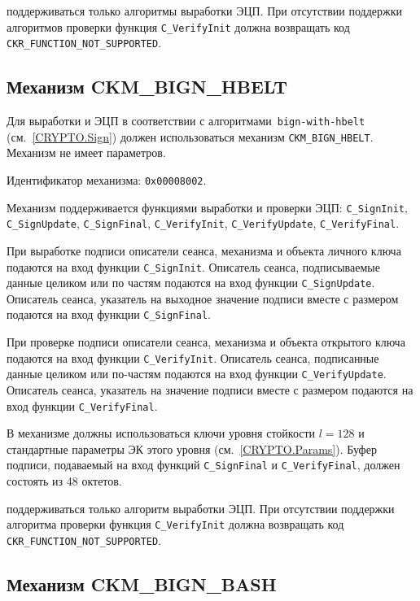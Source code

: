  поддерживаться только алгоритмы выработки ЭЦП.
При отсутствии поддержки алгоритмов проверки 
функция \verb|C_VerifyInit| должна возвращать код 
\verb|CKR_FUNCTION_NOT_SUPPORTED|.
%

\subsection{Механизм CKM\_BIGN\_HBELT}\label{CRYPTOKI.SignHBelt}

Для выработки и  ЭЦП в соответствии с 
алгоритмами~\texttt{bign-with-hbelt} (см.~\ref{CRYPTO.Sign}) должен 
использоваться механизм \verb|CKM_BIGN_HBELT|.
%
Механизм не имеет параметров.

Идентификатор механизма: \texttt{0x00008002}.

Механизм поддерживается функциями выработки и проверки ЭЦП: 
\verb|C_SignInit|, \verb|C_SignUpdate|, \verb|C_SignFinal|, 
\verb|C_VerifyInit|, \verb|C_VerifyUpdate|, \verb|C_VerifyFinal|.

При выработке подписи описатели сеанса, механизма и объекта
личного ключа подаются на вход функции \verb|C_SignInit|.
Описатель сеанса, подписываемые данные целиком или по частям подаются
на вход функции \verb|C_SignUpdate|.
Описатель сеанса, указатель на выходное значение подписи вместе с размером
подаются на вход функции \verb|C_SignFinal|.

При проверке подписи описатели сеанса, механизма и объекта
открытого ключа подаются на вход функции \verb|C_VerifyInit|.
Описатель сеанса, подписанные данные целиком или по-частям подаются
на вход функции \verb|C_VerifyUpdate|.
Описатель сеанса, указатель на значение подписи вместе с размером
подаются на вход функции \verb|C_VerifyFinal|.

В механизме должны использоваться ключи уровня стойкости $l=128$ 
и стандартные параметры ЭК этого уровня (см.~\ref{CRYPTO.Params}).
% 
Буфер подписи, подаваемый на вход функций \verb|C_SignFinal| и 
\verb|C_VerifyFinal|, должен состоять из 48 октетов.

 поддерживаться только алгоритм выработки ЭЦП.
При отсутствии поддержки алгоритма проверки 
функция \verb|C_VerifyInit| должна возвращать код 
\verb|CKR_FUNCTION_NOT_SUPPORTED|.
%

\subsection{Механизм CKM\_BIGN\_BASH}\label{CRYPTOKI.SignBash}

